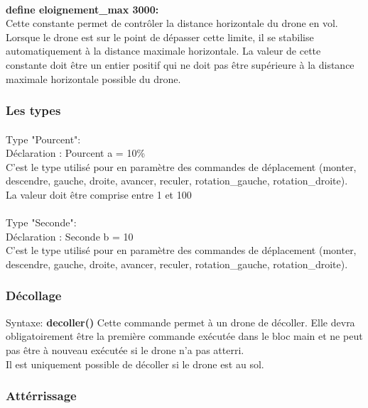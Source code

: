 \documentclass[12pt]{article}
\begin{document}
			\paragraph{}\textbf{define eloignement\_max 3000:}\\
				Cette constante permet de contrôler la distance horizontale du drone en vol. Lorsque le drone est sur le point de dépasser cette limite, il se stabilise automatiquement à la distance maximale horizontale. \newline
				La valeur de cette constante doit être un entier positif qui ne doit pas être supérieure à la distance maximale horizontale possible du drone.

        \subsubsection{Les types}
      	\paragraph{}Type "Pourcent":\\
		Déclaration : Pourcent a = 10\%\\
		C'est le type utilisé pour en paramètre des commandes de déplacement (monter, descendre, gauche, droite, avancer, reculer, rotation\_gauche, rotation\_droite).\\
		La valeur doit être comprise entre 1 et 100
	\paragraph{}Type "Seconde": \\ 
		Déclaration : Seconde b = 10\\
		C'est le type utilisé pour en paramètre des commandes de déplacement (monter, descendre, gauche, droite, avancer, reculer, rotation\_gauche, rotation\_droite).\\
	\subsubsection{Décollage}
		\quad Syntaxe: \textbf{decoller()}\bigbreak
			Cette commande permet à un drone de décoller. Elle devra obligatoirement être la première commande exécutée dans le bloc main et ne peut pas être à nouveau exécutée si le drone n'a pas atterri.\\
			Il est uniquement possible de décoller si le drone est au sol. 
	\subsubsection{Attérrissage}
\end{document}

